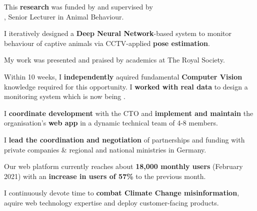 \documentclass[]{jonas-cv}
\begin{document}
\begin{minipage}[t]{0.63\textwidth} 

\tinysectionsep

\sectionsep

\begin{tightemize}
    \item This \textbf{research} was funded by  and supervised by\\
    , Senior Lecturer in Animal Behaviour.
    \item I iteratively designed a \textbf{Deep Neural Network}-based system to 
    monitor behaviour of captive animals via CCTV-applied \textbf{pose estimation}.
    \item My work was presented and praised by academics at The Royal Society.
    \item[\angleDoubleRightSymbol] Within 10 weeks, I \textbf{independently} aquired fundamental \textbf{Computer Vision}
    knowledge required for this opportunity. I \textbf{worked with real data} to design a 
    monitoring system which is now being
    .
\end{tightemize}
\sectionsep


\begin{tightemize}
    \item I \textbf{coordinate development} with the CTO and \textbf{implement and maintain} the organisation's \textbf{web app} in a dynamic technical team of 4-8 members.
    \item I \textbf{lead the coordination and negotiation} of partnerships and funding with private companies \& regional and national ministries in Germany.
    \item Our web platform currently reaches about \textbf{18,000 monthly users} (February 2021) with an \textbf{increase in users of 57\%} to the previous month.
    \item[\angleDoubleRightSymbol] I continuously devote time to \textbf{combat Climate Change misinformation}, aquire web technology expertise and deploy customer-facing products.
\end{tightemize}
\sectionsep



\end{minipage}
\end{document}
